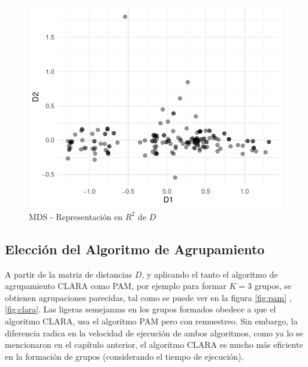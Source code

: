 \documentclass[12pt,oneside]{book}\usepackage[]{graphicx}\usepackage[]{color}
\makeatletter
\def\maxwidth{ %
  \ifdim\Gin@nat@width>\linewidth
    \linewidth
  \else
    \Gin@nat@width
  \fi
}
\newenvironment{knitrout}{}{} %
\theoremstyle{definition} %
\makeatother
\begin{document}
\begin{knitrout}
\color{fgcolor}\begin{figure}[h]

{\centering \includegraphics[width=\maxwidth]{figure/unnamed-chunk-3-1} 

}

\caption[MDS - Representación en $R^2$ de $D$]{MDS - Representación en $R^2$ de $D$}\label{fig:unnamed-chunk-3}
\end{figure}


\end{knitrout}

\label{fig:puntosD}



\subsection{Elección del Algoritmo de Agrupamiento}

A partir de la matriz de distancias $D$, y aplicando el tanto el algoritmo de agrupamiento CLARA como PAM, por ejemplo para formar $K=3$ grupos, se obtienen agrupaciones parecidas, tal como se puede ver en la figura \ref{fig:pam} , \ref{fig:clara}. Las ligeras semejanzas en los grupos formados obedece a que el algoritmo CLARA, usa el algoritmo PAM pero con remuestreo. Sin embargo, la diferencia radica en la velocidad de ejecución de ambos algoritmos, como ya lo se mencionaron en el capítulo anterior, el algoritmo CLARA es mucho más eficiente en la formación de grupos (considerando el tiempo de ejecución).
\end{document}
